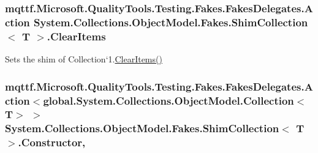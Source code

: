 \hypertarget{class_system_1_1_collections_1_1_object_model_1_1_fakes_1_1_shim_collection_3_01_t_01_4_af7ac9785ca2aaef2bff673b7685920c5}{
\subsubsection[{Clear\-Items}]{\setlength{\rightskip}{0pt plus 5cm}mqttf.\-Microsoft.\-Quality\-Tools.\-Testing.\-Fakes.\-Fakes\-Delegates.\-Action System.\-Collections.\-Object\-Model.\-Fakes.\-Shim\-Collection$<$ T $>$.Clear\-Items\hspace{0.3cm}{\ttfamily [set]}}}\label{class_system_1_1_collections_1_1_object_model_1_1_fakes_1_1_shim_collection_3_01_t_01_4_af7ac9785ca2aaef2bff673b7685920c5}


Sets the shim of Collection`1.\hyperlink{class_system_1_1_collections_1_1_object_model_1_1_fakes_1_1_shim_collection_3_01_t_01_4_af7ac9785ca2aaef2bff673b7685920c5}{Clear\-Items()}

\hypertarget{class_system_1_1_collections_1_1_object_model_1_1_fakes_1_1_shim_collection_3_01_t_01_4_a8b2fd033320b5062f5d5e78f2d19dd40}{
\subsubsection[{Constructor}]{\setlength{\rightskip}{0pt plus 5cm}mqttf.\-Microsoft.\-Quality\-Tools.\-Testing.\-Fakes.\-Fakes\-Delegates.\-Action$<$global.\-System.\-Collections.\-Object\-Model.\-Collection$<$T$>$ $>$ System.\-Collections.\-Object\-Model.\-Fakes.\-Shim\-Collection$<$ T $>$.Constructor\hspace{0.3cm}{\ttfamily [static]}, {\ttfamily [set]}}}\label{class_system_1_1_collections_1_1_object_model_1_1_fakes_1_1_shim_collection_3_01_t_01_4_a8b2fd033320b5062f5d5e78f2d19dd40}


